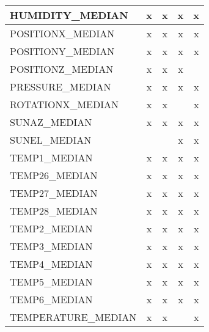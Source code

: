 \begin{table}
\begin{tabular}{lcccc}
        HUMIDITY\_MEDIAN      &      x &      x &      x &      x  \\ \hline
        POSITIONX\_MEDIAN     &      x &      x &      x &      x  \\ \hline
        POSITIONY\_MEDIAN     &      x &      x &      x &      x  \\ \hline
        POSITIONZ\_MEDIAN     &      x &      x &      x &         \\ \hline
        PRESSURE\_MEDIAN      &      x &      x &      x &      x  \\ \hline
        ROTATIONX\_MEDIAN     &      x &      x &        &      x  \\ \hline
        SUNAZ\_MEDIAN        &      x &      x &      x &      x   \\ \hline
        SUNEL\_MEDIAN        &        &        &      x &      x   \\ \hline
        TEMP1\_MEDIAN        &      x &      x &      x &      x   \\ \hline
        TEMP26\_MEDIAN        &      x &      x &      x &      x  \\ \hline
        TEMP27\_MEDIAN        &      x &      x &      x &      x  \\ \hline
        TEMP28\_MEDIAN        &      x &      x &      x &      x  \\ \hline
        TEMP2\_MEDIAN        &      x &      x &      x &      x    \\ \hline
        TEMP3\_MEDIAN        &      x &      x &      x &      x    \\ \hline
        TEMP4\_MEDIAN        &      x &      x &      x &      x    \\ \hline
        TEMP5\_MEDIAN        &      x &      x &      x &      x    \\ \hline
        TEMP6\_MEDIAN        &      x &      x &      x &      x    \\ \hline
        TEMPERATURE\_MEDIAN  &      x &      x &        &      x    \\ \hline
    \end{tabular}        
    \label{tab:exp2_top50_features1}
\end{table}

